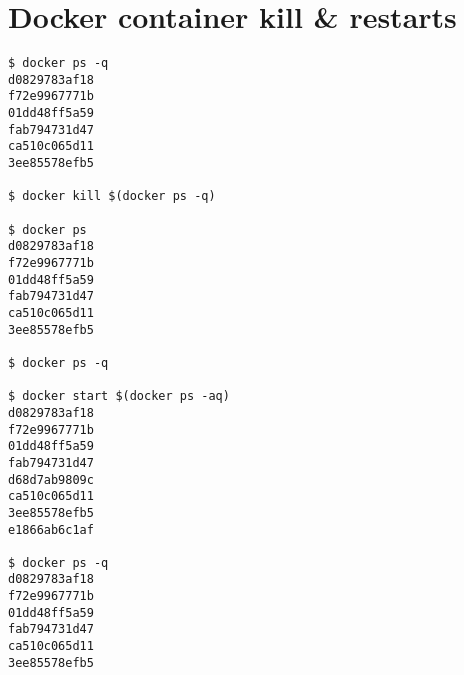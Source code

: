 \section{Docker container kill \& restarts}

\label{DockerKills}

\begin{verbatim}
$ docker ps -q
d0829783af18
f72e9967771b
01dd48ff5a59
fab794731d47
ca510c065d11
3ee85578efb5

$ docker kill $(docker ps -q) 

$ docker ps
d0829783af18
f72e9967771b
01dd48ff5a59
fab794731d47
ca510c065d11
3ee85578efb5

$ docker ps -q

$ docker start $(docker ps -aq)
d0829783af18
f72e9967771b
01dd48ff5a59
fab794731d47
d68d7ab9809c
ca510c065d11
3ee85578efb5
e1866ab6c1af

$ docker ps -q
d0829783af18
f72e9967771b
01dd48ff5a59
fab794731d47
ca510c065d11
3ee85578efb5
\end{verbatim}
